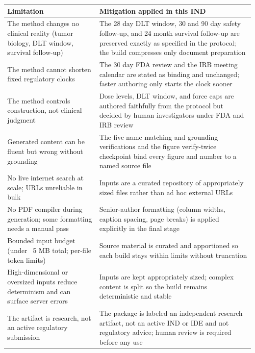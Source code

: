 \noindent\begin{tabularx}{\textwidth}{L{4.8cm} Y}
\toprule
\textbf{Limitation} & \textbf{Mitigation applied in this IND} \\
\midrule
The method changes no clinical reality (tumor biology, DLT window, survival follow-up) & The 28 day DLT window, 30 and 90 day safety follow-up, and 24 month survival follow-up are preserved exactly as specified in the protocol; the build compresses only document preparation \\
The method cannot shorten fixed regulatory clocks & The 30 day FDA review and the IRB meeting calendar are stated as binding and unchanged; faster authoring only starts the clock sooner \\
The method controls construction, not clinical judgment & Dose levels, DLT window, and force caps are authored faithfully from the protocol but decided by human investigators under FDA and IRB review \\
Generated content can be fluent but wrong without grounding & The five name-matching and grounding verifications and the figure verify-twice checkpoint bind every figure and number to a named source file \\
No live internet search at scale; URLs unreliable in bulk & Inputs are a curated repository of appropriately sized files rather than ad hoc external URLs \\
No PDF compiler during generation; some formatting needs a manual pass & Senior-author formatting (column widths, caption spacing, page breaks) is applied explicitly in the final stage \\
Bounded input budget (under ~5 MB total; per-file token limits) & Source material is curated and apportioned so each build stays within limits without truncation \\
High-dimensional or oversized inputs reduce determinism and can surface server errors & Inputs are kept appropriately sized; complex content is split so the build remains deterministic and stable \\
The artifact is research, not an active regulatory submission & The package is labeled an independent research artifact, not an active IND or IDE and not regulatory advice; human review is required before any use \\
\bottomrule
\end{tabularx}
\vspace*{-0.3cm}

